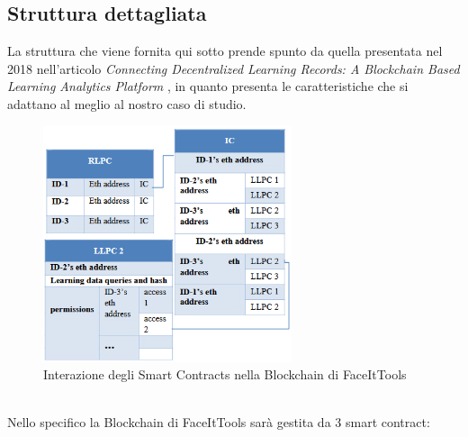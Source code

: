 \subsection{Struttura dettagliata}
La struttura che viene fornita qui sotto prende spunto da quella presentata nel 2018 nell'articolo \textit{Connecting Decentralized Learning Records: A Blockchain Based
Learning Analytics Platform} \cite{ocheja2018connecting}, in quanto presenta le caratteristiche che si adattano al meglio al nostro caso di studio.
\begin{figure}[h]
    \centering
    \includegraphics[width=0.65\textwidth]{Immagini/SmartContractsFaceIT.PNG}
    \caption{Interazione degli Smart Contracts nella Blockchain di FaceItTools}
\end{figure}
\\Nello specifico la Blockchain di FaceItTools sarà gestita da 3 smart contract:
